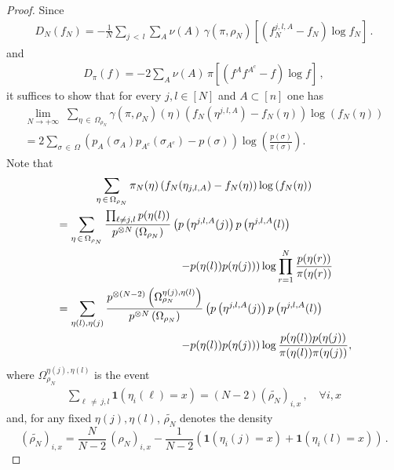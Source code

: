 \documentclass[AHL,Unicode,longabstracts,published]{cedram}
\newcommand{\Om}{\Omega}
\newcommand{\ind}{\mathbf{1}}
\let\g=\gamma
\let\r=\rho
\let\oldforall\forall
\renewcommand*{\forall}{\mathrel{\oldforall}}
\begin{document}
\begin{proof}
Since
\begin{align}\label{eq:fisha2}
D_N(f_N) = -\frac1{N}\sum_{j\,<\,l}\sum_A\nu(A)\,\g(\pi,\r_N)\left[\left(f_N^{j,l,A}-f_N\right)\log{f_N}\right]\,.
\end{align}
and
\begin{align}\label{eq:fisha4}
D_\pi(f) = - 2\sum_A\nu(A)\,\pi\left[\left(f^Af^{A^c}-f\right)\log{f}\right]\,,
\end{align}
it suffices to show that for every $j,l \in [N]$ and $A \subset [n]$ one has
\begin{multline*}
\lim_{N \to +\infty}\;\sum_{\eta\,\in\,\Om_{\rho_N}}\g(\pi,\r_N)(\eta)\left(f_N\left(\eta^{j,l,A}\right)-f_N(\eta)\right)\log\left({f_N(\eta)}\right) \\
= 2\sum_{\sigma\,\in\,\Om}\left(p_A(\sigma_A)p_{A^c}\left(\sigma_{A^c}\right)-p(\sigma)\right)\log\left(\frac{p(\sigma)}{\pi(\sigma)}\right).
\end{multline*}
Note that
\begin{multline*}
 \sum_{\eta\,\in\,\Om_{\rho_N}}\pi_N(\eta)\left(f_N(\eta_{j,l,A})-f_N(\eta)\right)\log\left({f_N(\eta)}\right) \\
\begin{aligned}
&=\sum_{\eta\,\in\,\Om_{\rho_N}}
\frac{\prod_{\ell \neq j,l}p(\eta(l))}{p^{\otimes N}\left(\Om_{\rho_N}\right)}\left(p\left(\eta^{j,l,A}(j)\right)p\left(\eta^{j,l,A}(l)\right)\right.\\
&\mkern200mu \left. -p(\eta(l))p(\eta(j))\right)\log\prod_{r=1}^N\frac{p(\eta(r))}{\pi(\eta(r))} \\
&=\sum_{\eta(l),\eta(j) }\frac{p^{\otimes (N-2)}\left(\Om^{\eta(j),\eta(l)}_{\rho_N}\right)}{p^{\otimes N}\left(\Om_{\rho_N}\right)}\left(p\left(\eta^{j,l,A}(j)\right)p\left(\eta^{j,l,A}(l)\right)\right.\\
&\mkern200mu\left. -p(\eta(l))p(\eta(j))\right)\log\frac{p(\eta(l))p(\eta(j))}{\pi(\eta(l))\pi(\eta(j))},
\end{aligned}
\end{multline*}
where $\Om^{\eta(j),\eta(l)}_{\rho_N}$ is the event
\begin{align}
\sum_{\ell\,\neq\,j,l} \ind(\eta_i(\ell)=x) = (N-2)(\widetilde{\rho_N})_{i,x}\,,\quad \forall i,x
\end{align}
and, for any fixed $\eta(j),\eta(l)$, $\widetilde{\rho_N}$ denotes the density
\[
(\widetilde{\rho_N})_{i,x} = \frac{N}{N-2}\, (\r_N)_{i,x} - \frac{1}{N-2}\left(\ind(\eta_i(j)=x)+\ind(\eta_i(l)=x)
\right)\,.
\]
\end{proof}
\end{document}
